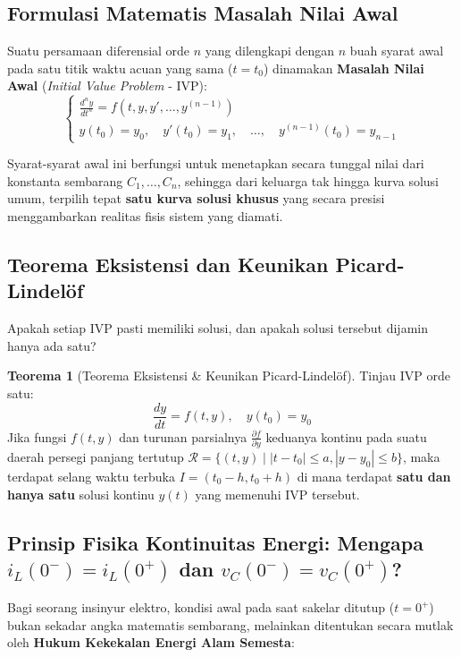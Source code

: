 \documentclass[11pt,a4paper]{article}
\theoremstyle{definition}
\newtheorem{theorem}{Teorema}[section]
\begin{document}
\subsection{Formulasi Matematis Masalah Nilai Awal}
Suatu persamaan diferensial orde $n$ yang dilengkapi dengan $n$ buah syarat awal pada satu titik waktu acuan yang sama ($t = t_0$) dinamakan \textbf{Masalah Nilai Awal} (\textit{Initial Value Problem} - IVP):
\begin{equation}
    \begin{cases}
        \frac{d^ny}{dt^n} = f\left(t, y, y', \dots, y^{(n-1)}\right) \\
        y(t_0) = y_0, \quad y'(t_0) = y_1, \quad \dots, \quad y^{(n-1)}(t_0) = y_{n-1}
    \end{cases}
    \label{eq:ivp_form}
\end{equation}

Syarat-syarat awal ini berfungsi untuk menetapkan secara tunggal nilai dari konstanta sembarang $C_1, \dots, C_n$, sehingga dari keluarga tak hingga kurva solusi umum, terpilih tepat \textbf{satu kurva solusi khusus} yang secara presisi menggambarkan realitas fisis sistem yang diamati.

\subsection{Teorema Eksistensi dan Keunikan Picard-Lindelöf}
Apakah setiap IVP pasti memiliki solusi, dan apakah solusi tersebut dijamin hanya ada satu?

\begin{theorem}[Teorema Eksistensi \& Keunikan Picard-Lindelöf]
Tinjau IVP orde satu:
\begin{equation}
    \frac{dy}{dt} = f(t, y), \quad y(t_0) = y_0
\end{equation}
Jika fungsi $f(t, y)$ dan turunan parsialnya $\frac{\partial f}{\partial y}$ keduanya kontinu pada suatu daerah persegi panjang tertutup $\mathcal{R} = \{ (t, y) \mid |t - t_0| \le a, |y - y_0| \le b \}$, maka terdapat selang waktu terbuka $I = (t_0 - h, t_0 + h)$ di mana terdapat \textbf{satu dan hanya satu} solusi kontinu $y(t)$ yang memenuhi IVP tersebut.
\end{theorem}

\subsection{Prinsip Fisika Kontinuitas Energi: Mengapa \texorpdfstring{$i_L(0^-) = i_L(0^+)$ dan $v_C(0^-) = v_C(0^+)$}{iL(0-) = iL(0+) dan vC(0-) = vC(0+)}?}
Bagi seorang insinyur elektro, kondisi awal pada saat sakelar ditutup ($t = 0^+$) bukan sekadar angka matematis sembarang, melainkan ditentukan secara mutlak oleh \textbf{Hukum Kekekalan Energi Alam Semesta}:
\end{document}
